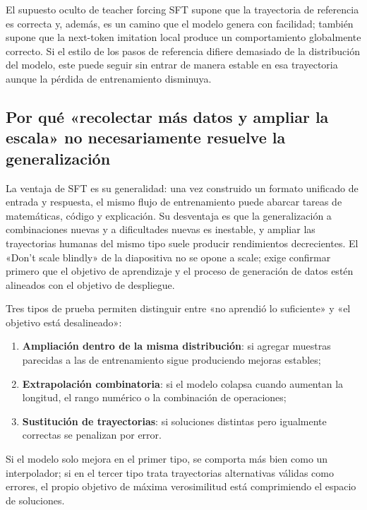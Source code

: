 \begin{warningbox}{El supuesto oculto de teacher forcing}
SFT supone que la trayectoria de referencia es correcta y, además, es un camino que el modelo genera con facilidad; también supone que la next-token imitation local produce un comportamiento globalmente correcto. Si el estilo de los pasos de referencia difiere demasiado de la distribución del modelo, este puede seguir sin entrar de manera estable en esa trayectoria aunque la pérdida de entrenamiento disminuya.
\end{warningbox}

\subsection{Por qué «recolectar más datos y ampliar la escala» no necesariamente resuelve la generalización}

La ventaja de SFT es su generalidad: una vez construido un formato unificado de entrada y respuesta, el mismo flujo de entrenamiento puede abarcar tareas de matemáticas, código y explicación. Su desventaja es que la generalización a combinaciones nuevas y a dificultades nuevas es inestable, y ampliar las trayectorias humanas del mismo tipo suele producir rendimientos decrecientes. El «Don't scale blindly» de la diapositiva no se opone a scale; exige confirmar primero que el objetivo de aprendizaje y el proceso de generación de datos estén alineados con el objetivo de despliegue.



Tres tipos de prueba permiten distinguir entre «no aprendió lo suficiente» y «el objetivo está desalineado»:
\begin{enumerate}
  \item \textbf{Ampliación dentro de la misma distribución}: si agregar muestras parecidas a las de entrenamiento sigue produciendo mejoras estables;
  \item \textbf{Extrapolación combinatoria}: si el modelo colapsa cuando aumentan la longitud, el rango numérico o la combinación de operaciones;
  \item \textbf{Sustitución de trayectorias}: si soluciones distintas pero igualmente correctas se penalizan por error.
\end{enumerate}
Si el modelo solo mejora en el primer tipo, se comporta más bien como un interpolador; si en el tercer tipo trata trayectorias alternativas válidas como errores, el propio objetivo de máxima verosimilitud está comprimiendo el espacio de soluciones.

